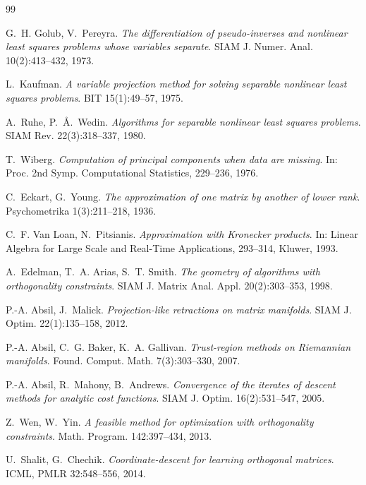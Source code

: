 \documentclass[11pt,a4paper]{article}
\theoremstyle{plain}
\theoremstyle{definition}
\theoremstyle{remark}
\begin{document}
\begin{thebibliography}{99}\small

G.~H. Golub, V.~Pereyra.
\emph{The differentiation of pseudo-inverses and nonlinear least squares
problems whose variables separate}.
SIAM J. Numer. Anal. 10(2):413--432, 1973.

L.~Kaufman.
\emph{A variable projection method for solving separable nonlinear least
squares problems}. BIT 15(1):49--57, 1975.

A.~Ruhe, P.~{\AA}.~Wedin.
\emph{Algorithms for separable nonlinear least squares problems}.
SIAM Rev. 22(3):318--337, 1980.

T.~Wiberg.
\emph{Computation of principal components when data are missing}.
In: Proc. 2nd Symp. Computational Statistics, 229--236, 1976.

C.~Eckart, G.~Young.
\emph{The approximation of one matrix by another of lower rank}.
Psychometrika 1(3):211--218, 1936.

C.~F. Van Loan, N.~Pitsianis.
\emph{Approximation with Kronecker products}.
In: Linear Algebra for Large Scale and Real-Time Applications, 293--314,
Kluwer, 1993.

A.~Edelman, T.~A. Arias, S.~T. Smith.
\emph{The geometry of algorithms with orthogonality constraints}.
SIAM J. Matrix Anal. Appl. 20(2):303--353, 1998.

P.-A. Absil, J.~Malick.
\emph{Projection-like retractions on matrix manifolds}.
SIAM J. Optim. 22(1):135--158, 2012.

P.-A. Absil, C.~G. Baker, K.~A. Gallivan.
\emph{Trust-region methods on Riemannian manifolds}.
Found. Comput. Math. 7(3):303--330, 2007.

P.-A. Absil, R.~Mahony, B.~Andrews.
\emph{Convergence of the iterates of descent methods for analytic cost
functions}. SIAM J. Optim. 16(2):531--547, 2005.

Z.~Wen, W.~Yin.
\emph{A feasible method for optimization with orthogonality constraints}.
Math. Program. 142:397--434, 2013.

U.~Shalit, G.~Chechik.
\emph{Coordinate-descent for learning orthogonal matrices}.
ICML, PMLR 32:548--556, 2014.


\end{thebibliography}
\end{document}
